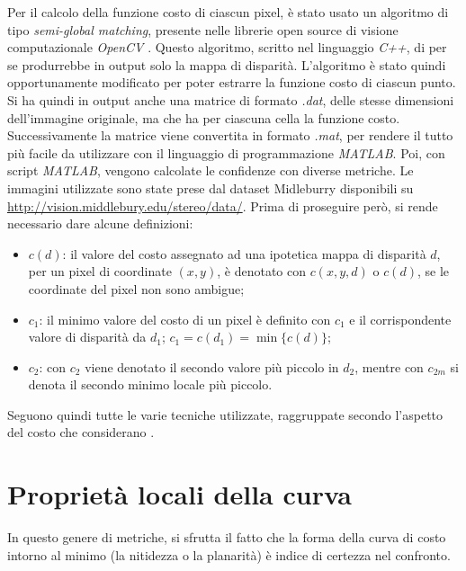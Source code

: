 \documentclass[12pt]{report}
\begin{document}
			Per il calcolo della funzione costo di ciascun pixel, è stato usato un algoritmo di tipo \textit{semi-global matching}, presente nelle librerie open source di visione computazionale \textit{OpenCV} \cite{opencv}. Questo algoritmo, scritto nel linguaggio \textit{C++}, di per se produrrebbe in output solo la mappa di disparità. L'algoritmo è stato quindi opportunamente modificato per poter estrarre la funzione costo di ciascun punto. Si ha quindi in output anche una matrice di formato \textit{.dat}, delle stesse dimensioni dell'immagine originale, ma che ha per ciascuna cella la funzione costo. Successivamente la matrice viene convertita in formato \textit{.mat}, per rendere il tutto più facile da utilizzare con il linguaggio di programmazione \textit{MATLAB}. Poi, con script \textit{MATLAB}, vengono calcolate le confidenze con diverse metriche. Le immagini utilizzate sono state prese dal dataset Midleburry \cite{dataset_2006_1,dataset_2006_2} disponibili su \url{http://vision.middlebury.edu/stereo/data/}. \newline
			Prima di proseguire però, si rende necessario dare alcune definizioni:  		
		
			\begin{itemize}
				\item $c(d)$: il valore del costo assegnato ad una ipotetica mappa di disparità $d$, per un pixel di coordinate $(x,y)$, è denotato con $c(x,y,d)$ o $c(d)$, se le coordinate del pixel non sono ambigue;
			
				\item $c_{1}$: il minimo valore del costo di un pixel è definito con $c_{1}$ e il corrispondente valore di disparità da $d_{1}$; $c_{1}=c(d_{1})=\min\{c(d)\}$;
			
				\item $c_{2}$: con $c_{2}$ viene denotato il secondo valore più piccolo in $d_{2}$, mentre con $c_{2m}$ si denota il secondo minimo locale più piccolo.
				\label{item:definizioni}
			\end{itemize}
			
			\noindent Seguono quindi tutte le varie tecniche utilizzate, raggruppate secondo l'aspetto del costo che considerano \cite{indoors_outdoors}.
		
		
		
		\section{Proprietà locali della curva}
		\label{sec:localProperties}	
			In questo genere di metriche, si sfrutta il fatto che la forma della curva di costo intorno al minimo (la nitidezza o la planarità) è indice di certezza nel confronto.
			
\end{document}
